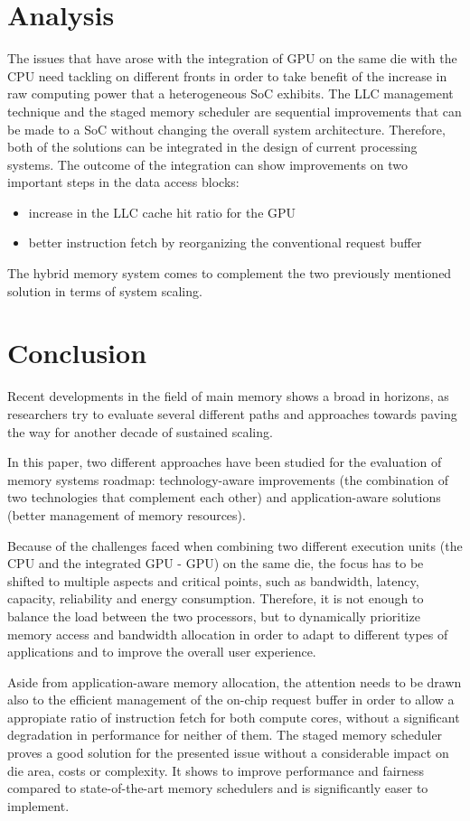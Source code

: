\documentclass[12pt,journal,compsoc]{IEEEtran}
\begin{document}
\section{Analysis}
The issues that have arose with the integration of GPU on the same die with the CPU need tackling on different fronts in order to take benefit of the increase in raw computing power that a heterogeneous SoC exhibits. 
The LLC management technique and the staged memory scheduler are sequential improvements that can be made to a SoC without changing the overall system architecture. Therefore, both of the solutions can be integrated in the design of current processing systems. The outcome of the integration can show improvements on two important steps in the data access blocks:
\begin{itemize}
	\item
	increase in the LLC cache hit ratio for the GPU
	\item
	better instruction fetch by reorganizing the conventional request buffer 
\end{itemize}
The hybrid memory system comes to complement the two previously mentioned solution in terms of system scaling. 

\section{Conclusion}
Recent developments in the field of main memory shows a broad in horizons, as researchers try to evaluate several different paths and approaches towards paving the way for another decade of sustained scaling. 

In this paper, two different approaches have been studied for the evaluation of memory systems roadmap: technology-aware improvements (the combination of two technologies that complement each other)  and application-aware solutions (better management of memory resources). 

Because of the challenges faced when combining two different execution units (the CPU and the integrated GPU - GPU) on the same die, the focus has to be shifted to multiple aspects and critical points, such as bandwidth, latency, capacity, reliability and energy consumption. Therefore, it is not enough to balance the load between the two processors, but to dynamically prioritize memory access \cite{LLC} and bandwidth allocation in order to adapt to different types of applications and to improve the overall user experience. 

Aside from application-aware memory allocation, the attention needs to be drawn also to the efficient management of the on-chip request buffer in order to allow a appropiate ratio of instruction fetch for both compute cores, without a significant degradation in performance for neither of them. The  staged memory scheduler proves a good solution for the presented issue without a considerable impact on die area, costs or complexity.  It shows to improve performance and fairness compared to state-of-the-art memory schedulers and is significantly easer to implement\cite{SmS}.
\end{document}
